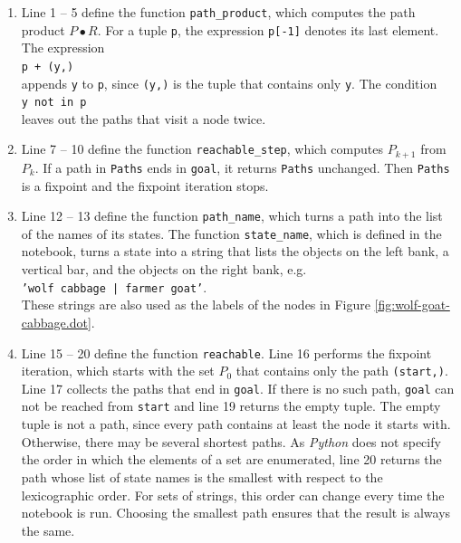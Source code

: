 \begin{enumerate}
\item Line 1 -- 5 define the function \texttt{path\_product}, which computes the path product $P \bullet R$.  For
      a tuple \texttt{p}, the expression \texttt{p[-1]} denotes its last element.  The expression
      \\[0.2cm]
      \hspace*{1.3cm}
      \texttt{p + (y,)}
      \\[0.2cm]
      appends \texttt{y} to \texttt{p}, since \texttt{(y,)} is the tuple that contains only \texttt{y}.  The
      condition
      \\[0.2cm]
      \hspace*{1.3cm}
      \texttt{y not in p}
      \\[0.2cm]
      leaves out the paths that visit a node twice.
\item Line 7 -- 10 define the function \texttt{reachable\_step}, which computes $P_{k+1}$ from $P_k$.  If a path in
      \texttt{Paths} ends in \texttt{goal}, it returns \texttt{Paths} unchanged.  Then \texttt{Paths} is a fixpoint
      and the fixpoint iteration stops.
\item Line 12 -- 13 define the function \texttt{path\_name}, which turns a path into the list of the names of its
      states.  The function \texttt{state\_name}, which is defined in the notebook, turns a state into a string
      that lists the objects on the left bank, a vertical bar, and the objects on the right bank, e.g.
      \\[0.2cm]
      \hspace*{1.3cm}
      \texttt{'wolf cabbage | farmer goat'}.
      \\[0.2cm]
      These strings are also used as the labels of the nodes in Figure \ref{fig:wolf-goat-cabbage.dot}.
\item Line 15 -- 20 define the function \texttt{reachable}.  Line 16 performs the fixpoint iteration, which starts
      with the set $P_0$ that contains only the path \texttt{(start,)}.  Line 17 collects the paths that end in
      \texttt{goal}.  If there is no such path, \texttt{goal} can not be reached from \texttt{start} and line 19
      returns the empty tuple.  The empty tuple is not a path, since every path contains at least the node it
      starts with.  Otherwise, there may be several shortest paths.  As \textsl{Python} does not specify the
      order in which the elements of a set are enumerated, line 20 returns the path whose list of state names is
      the smallest with respect to the lexicographic order.  For sets of strings, this order can change every time
      the notebook is run.  Choosing the smallest path ensures that the result is always the same.
\end{enumerate}
